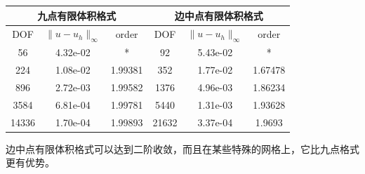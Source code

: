 \documentclass[12pt,a4paper]{article}
\theoremstyle{plain}
\begin{document}
\begin{table}
\centering
\begin{tabular}{ccc|ccc}
\multicolumn{3}{c}{九点有限体积格式}  & \multicolumn{3}{c}{边中点有限体积格式} \\
\hline
DOF & $\|u - u_h\|_{\infty}$ & order & DOF & $\|u - u_h\|_{\infty}$ & order \\
\hline
56 & 4.32e-02 & * & 92 & 5.43e-02 & * \\
224 & 1.08e-02 & 1.99381 & 352 & 1.77e-02 & 1.67478 \\
896 & 2.72e-03 & 1.99582 & 1376 & 4.96e-03 & 1.86234 \\
3584 & 6.81e-04 & 1.99781 & 5440 & 1.31e-03 & 1.93628 \\
14336 & 1.70e-04 & 1.99893 & 21632 & 3.37e-04 & 1.9693 \\
\hline
\end{tabular}
\end{table}

边中点有限体积格式可以达到二阶收敛，而且在某些特殊的网格上，它比九点格式更有优势。

%
%
\end{document}

